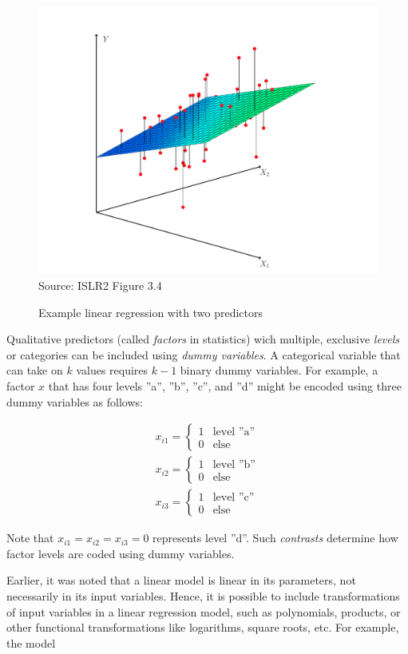 \begin{figure}
\centering
\includegraphics[width=.66\textwidth]{../class11/Figures_Chapters_1-6/Chapter3/3_4.pdf}  \\

\scriptsize Source: ISLR2 Figure 3.4
\caption{Example linear regression with two predictors}
\label{fig:plane}
\end{figure}

Qualitative predictors (called \emph{factors} in statistics) wich multiple, exclusive \emph{levels} or categories can be included using \emph{dummy variables}. A categorical variable that can take on $k$ values requires $k-1$ binary dummy variables. For example, a factor $x$ that has four levels ''a'', ''b'', ''c'', and ''d'' might be encoded using three dummy variables as follows:

\begin{align*}
x_{i1} = \begin{cases}
1 & \text{level ''a''} \\
0 & \text{else}
\end{cases} \\
x_{i2} = \begin{cases}
1 & \text{level ''b''} \\
0 & \text{else}
\end{cases} \\
x_{i3} = \begin{cases}
1 & \text{level ''c''} \\
0 & \text{else}
\end{cases}
\end{align*}

\noindent Note that $x_{i1} = x_{i2} = x_{i3} = 0$ represents level ''d''. Such \emph{contrasts} determine how factor levels are coded using dummy variables.

Earlier, it was noted that a linear model is linear in its parameters, not necessarily in its input variables. Hence, it is possible to include transformations of input variables in a linear regression model, such as polynomials, products, or other functional transformations like logarithms, square roots, etc. For example, the model

